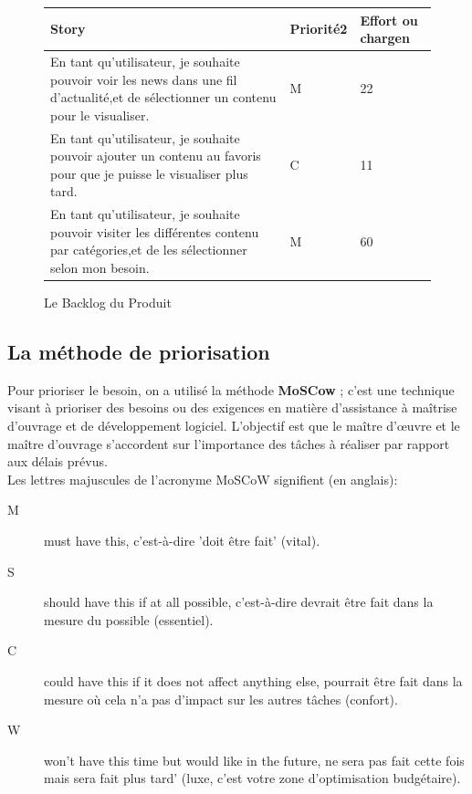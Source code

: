 \begin{figure}[h]
\begin{tabular}{|p{7cm}|p{4cm}|p{4cm}|}
\hline
\textbf{Story} & \textbf{Priorité2 } & \textbf{Effort ou chargen} \\
\hline
En tant qu'utilisateur, je souhaite pouvoir voir les news dans une fil d'actualité,et de sélectionner un contenu pour le visualiser. & \begin{center}M\end{center} & \begin{center}22\end{center}\\
\hline
En tant qu'utilisateur, je souhaite pouvoir ajouter un contenu au favoris pour que je puisse le visualiser plus tard. & \begin{center}C\end{center} & \begin{center}11\end{center}\\
\hline
En tant qu'utilisateur, je souhaite pouvoir visiter les différentes contenu par catégories,et de les sélectionner selon mon besoin. & \begin{center}M\end{center} & \begin{center}60\end{center}\\
\hline
\end{tabular}
  \caption{Le Backlog du Produit}
  \label{fig:Backlog}
\end{figure}
\subsection{La méthode de priorisation}
Pour prioriser le besoin, on a utilisé la méthode  \textbf{MoSCow} ; c'est une technique visant à prioriser des besoins ou des exigences en matière d'assistance à maîtrise d'ouvrage et de développement logiciel. L'objectif est que le maître d'œuvre et le maître d'ouvrage s'accordent sur l'importance des tâches à réaliser par rapport aux délais prévus.\\[0.2cm]
Les lettres majuscules de l'acronyme MoSCoW signifient (en anglais):\\[0.2cm]
\begin{description}
\item[M] must have this, c'est-à-dire 'doit être fait' (vital).
\item[S] should have this if at all possible, c'est-à-dire devrait être fait dans la mesure du possible (essentiel).
\item[C] could have this if it does not affect anything else, pourrait être fait dans la mesure où cela n'a pas d'impact sur les autres tâches (confort).
\item[W] won't have this time but would like in the future, ne sera pas fait cette fois mais sera fait plus tard' (luxe, c'est votre zone d'optimisation budgétaire).
\end{description}






